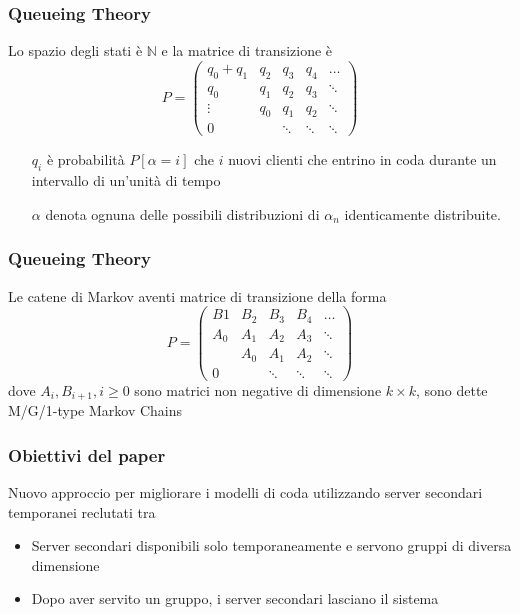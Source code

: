 \documentclass{beamer}
\newcommand{\N}{\mathbb{N}}
\begin{document}
\begin{frame}
    \frametitle{Queueing Theory}
    Lo spazio degli stati è $\N$ e la matrice di transizione è
    \begin{equation*}
        P = \begin{pmatrix}
            q_0 + q_1 & q_2 & q_3 & q_4 & \ldots \\
            q_0 & q_1 & q_2 & q_3 & \ddots \\
            \vdots & q_0 & q_1 & q_2 & \ddots \\
            0 &  & \ddots & \ddots & \ddots
        \end{pmatrix}
    \end{equation*}
    \begin{block}{}
        \begin{itemize}
            \item [$q_i$] è probabilità $P[\alpha=i]$ che $i$ nuovi clienti che entrino in coda durante un intervallo di un'unità di tempo
            \item [$\alpha$] denota ognuna delle possibili distribuzioni di $\alpha_n$ identicamente distribuite.
        \end{itemize}
    \end{block}
\end{frame}


\begin{frame}
    \frametitle{Queueing Theory}
    Le catene di Markov aventi matrice di transizione della forma
    \begin{equation*}
        P = \begin{pmatrix}
            B1 & B_2 & B_3 & B_4 & \ldots \\
            A_0 & A_1 & A_2 & A_3 & \ddots \\
                & A_0 & A_1 & A_2 & \ddots \\
            0   &     & \ddots & \ddots & \ddots
        \end{pmatrix}
    \end{equation*}
    \noindent dove $A_i, B_{i+1}, i \geq 0$ sono matrici non negative di dimensione $k \times k$, sono dette M/G/1-type Markov Chains
\end{frame}

\begin{frame}
    \frametitle{Obiettivi del paper}
    Nuovo approccio per migliorare i modelli di coda utilizzando server secondari temporanei reclutati tra
    \begin{block}{}
            \begin{itemize}
                \item Server secondari disponibili solo temporaneamente e servono gruppi di diversa dimensione
                \item Dopo aver servito un gruppo, i server secondari lasciano il sistema
            \end{itemize}
    \end{block}
\end{frame}
\end{document}

